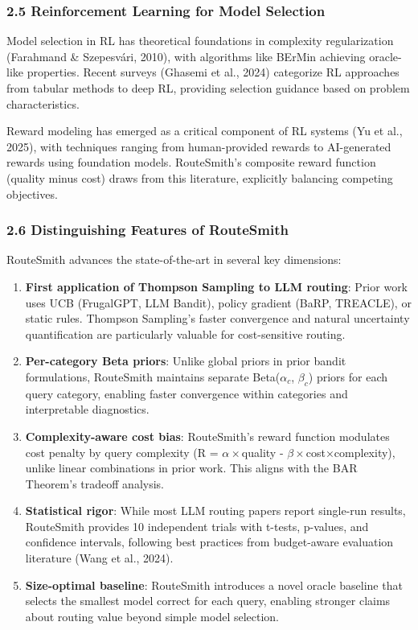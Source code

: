\documentclass[
]{article}
\begin{document}
\hypertarget{reinforcement-learning-for-model-selection}{%
\subsubsection{2.5 Reinforcement Learning for Model
Selection}\label{reinforcement-learning-for-model-selection}}

Model selection in RL has theoretical foundations in complexity
regularization (Farahmand \& Szepesvári, 2010), with algorithms like
BErMin achieving oracle-like properties. Recent surveys (Ghasemi et al.,
2024) categorize RL approaches from tabular methods to deep RL,
providing selection guidance based on problem characteristics.

Reward modeling has emerged as a critical component of RL systems (Yu et
al., 2025), with techniques ranging from human-provided rewards to
AI-generated rewards using foundation models. RouteSmith's composite
reward function (quality minus cost) draws from this literature,
explicitly balancing competing objectives.

\hypertarget{distinguishing-features-of-routesmith}{%
\subsubsection{2.6 Distinguishing Features of
RouteSmith}\label{distinguishing-features-of-routesmith}}

RouteSmith advances the state-of-the-art in several key dimensions:

\begin{enumerate}
\def\labelenumi{\arabic{enumi}.}
\item
  \textbf{First application of Thompson Sampling to LLM routing}: Prior
  work uses UCB (FrugalGPT, LLM Bandit), policy gradient (BaRP,
  TREACLE), or static rules. Thompson Sampling's faster convergence and
  natural uncertainty quantification are particularly valuable for
  cost-sensitive routing.
\item
  \textbf{Per-category Beta priors}: Unlike global priors in prior
  bandit formulations, RouteSmith maintains separate Beta(\(\alpha_c\),
  \(\beta_c\)) priors for each query category, enabling faster
  convergence within categories and interpretable diagnostics.
\item
  \textbf{Complexity-aware cost bias}: RouteSmith's reward function
  modulates cost penalty by query complexity (R =
  \(\alpha\times\)quality - \(\beta\times\)cost×complexity), unlike
  linear combinations in prior work. This aligns with the BAR Theorem's
  tradeoff analysis.
\item
  \textbf{Statistical rigor}: While most LLM routing papers report
  single-run results, RouteSmith provides 10 independent trials with
  t-tests, p-values, and confidence intervals, following best practices
  from budget-aware evaluation literature (Wang et al., 2024).
\item
  \textbf{Size-optimal baseline}: RouteSmith introduces a novel oracle
  baseline that selects the smallest model correct for each query,
  enabling stronger claims about routing value beyond simple model
  selection.
\end{enumerate}
\end{document}
